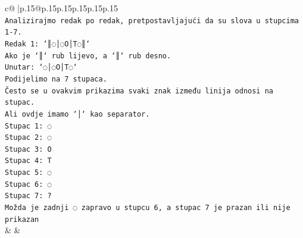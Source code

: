 \documentclass{article}
\begin{document}
{\begin{supertabular}{c@{$\;$}|p{.15\linewidth}@{}p{.15\linewidth}p{.15\linewidth}p{.15\linewidth}p{.15\linewidth}p{.15\linewidth}}
{{{\\ 
\texttt{Analizirajmo redak po redak, pretpostavljajući da su slova u stupcima 1{-}7.} \\
\texttt{Redak 1: `║◌│◌O│T◌║`} \\
\texttt{Ako je `║` rub lijevo, a `║` rub desno.} \\
\texttt{Unutar: `◌│◌O│T◌`} \\
\texttt{Podijelimo na 7 stupaca.} \\
\texttt{Često se u ovakvim prikazima svaki znak između linija odnosi na stupac.} \\
\texttt{Ali ovdje imamo `│` kao separator.} \\
\texttt{Stupac 1: ◌} \\
\texttt{Stupac 2: ◌} \\
\texttt{Stupac 3: O} \\
\texttt{Stupac 4: T} \\
\texttt{Stupac 5: ◌} \\
\texttt{Stupac 6: ◌} \\
\texttt{Stupac 7: ?} \\
\texttt{Možda je zadnji ◌ zapravo u stupcu 6, a stupac 7 je prazan ili nije prikazan} \\
            }
        }
    }
    & & \\ \\


\end{supertabular}}
\end{document}
